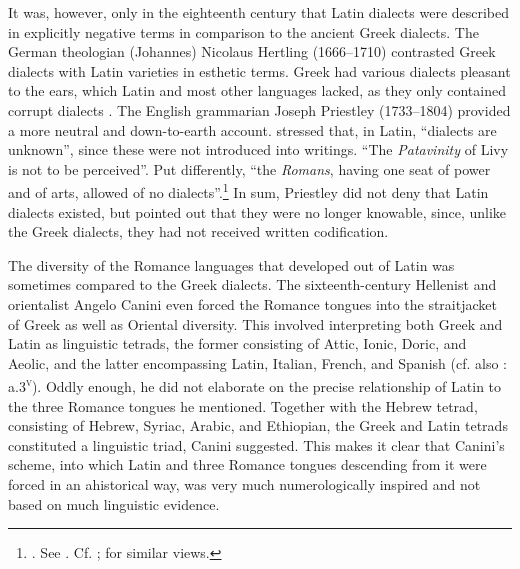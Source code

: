 It was, however, only in the eighteenth century that Latin dialects were described in explicitly negative terms in comparison to the ancient Greek dialects. The German theologian (Johannes) Nicolaus Hertling (1666–1710) contrasted Greek dialects with Latin varieties in esthetic terms. Greek had various dialects pleasant to the ears, which Latin and most other languages lacked, as they only contained corrupt dialects \citep[73]{Hertling1708}. The English grammarian Joseph Priestley (1733–1804) provided a more neutral and down-to-earth account. \citet[138]{Priestley1762} stressed that, in Latin, “dialects are unknown”, since these were not introduced into writings. “The \textit{Patavinity} of Livy is not to be perceived”. Put differently, “the \textit{Romans}, having one seat of power and of arts, allowed of no dialects”.\footnote{\citet[280]{Priestley1762}. See \citet[52]{Amsler1993}. Cf. \citet[49]{Galiani1779}; \citet[203--205]{Ries1786} for similar views.} In sum, Priestley did not deny that Latin dialects existed, but pointed out that they were no longer knowable, since, unlike the Greek dialects, they had not received written codification.

The diversity of the Romance languages that developed out of Latin was sometimes compared to the Greek dialects. The sixteenth-century Hellenist and orientalist Angelo Canini even forced the Romance tongues into the straitjacket of Greek as well as Oriental diversity. This involved \citet[\textsc{a}.iii\textsc{\textsuperscript{r}}]{Canini1554} interpreting both Greek and Latin as linguistic tetrads, the former consisting of Attic, Ionic, Doric, and Aeolic, and the latter encompassing Latin, Italian, French, and Spanish (cf. also \citealt{Canini1555}: a.3\textsc{\textsuperscript{v}}). Oddly enough, he did not elaborate on the precise relationship of Latin to the three Romance tongues he mentioned. Together with the Hebrew tetrad, consisting of Hebrew, Syriac, Arabic, and Ethiopian, the Greek and Latin tetrads constituted a linguistic triad, Canini suggested. This makes it clear that Canini’s scheme, into which Latin and three Romance tongues descending from it were forced in an ahistorical way, was very much numerologically inspired and not based on much linguistic evidence.

